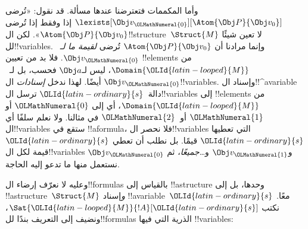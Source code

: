 \documentclass[../../../include/open-logic-section]{subfiles}
\begin{document}
وأما المكممات فتعترضنا عندها مسألة. قد نقول:
«تُرضى $\lexists[\Obj v_\OLMathNumeral{0}][\Atom{\Obj P}{\Obj v_0}]$ إذا وفقط
إذا تُرضى $\Atom{\Obj P}{\Obj v_0}$». لكن
ال!!{structure}~$\Struct{M}$ لا تعين شيئًا لل!!{variable}s.
وإنما مرادنا أن $\Atom{\Obj P}{\Obj v_0}$ تُرضى
\emph{لقيمة ما لـ~$\Obj v_\OLMathNumeral{0}$}. فلا بد من تعيين
!!{element}s من $\Domain{\OLId{latin-looped}{M}}$، ليس لـ$\Obj a$ فحسب، بل
لـ~$\Obj v_\OLMathNumeral{0}$ أيضًا. لهذا ندخل \emph{إسنادات} ال!!{variable}s.
وإسناد ال!!^a{variable} دالة~$\OLId{latin-ordinary}{s}$ ترسل ال!!{variable}s إلى
!!{element}s من $\Domain{\OLId{latin-looped}{M}}$، أي إلى $\OLMathNumeral{0}$ أو $\OLMathNumeral{1}$ أو~$\OLMathNumeral{2}$ في
مثالنا. ولا نعلم سلفًا أي ال!!{variable}s ستقع في
!!a{formula}، فلا نحصر ال!!{variable}s التي تعطيها $\OLId{latin-ordinary}{s}$ قيمًا.
بل نطلب أن تعطي $\OLId{latin-ordinary}{s}$ قيمة لكل ال!!{variable}s
$\Obj v_\OLMathNumeral{0}$ و$\Obj v_\OLMathNumeral{1}$ و\dots\@ \emph{جميعًا}، ثم نستعمل
منها ما تدعو إليه الحاجة.

وعليه لا نعرّف إرضاء ال!!{formula}s بالقياس إلى !!a{structure}
وحدها، بل إلى !!a{structure}~$\Struct{M}$ \emph{و}إسناد
!!a{variable}~$\OLId{latin-ordinary}{s}$ معًا. نكتب $\Sat{\OLId{latin-looped}{M}}{!A}[\OLId{latin-ordinary}{s}]$، ونضيف إلى
التعريف بندًا لل!!{formula}s الذرية التي فيها !!{variable}s:
\end{document}
